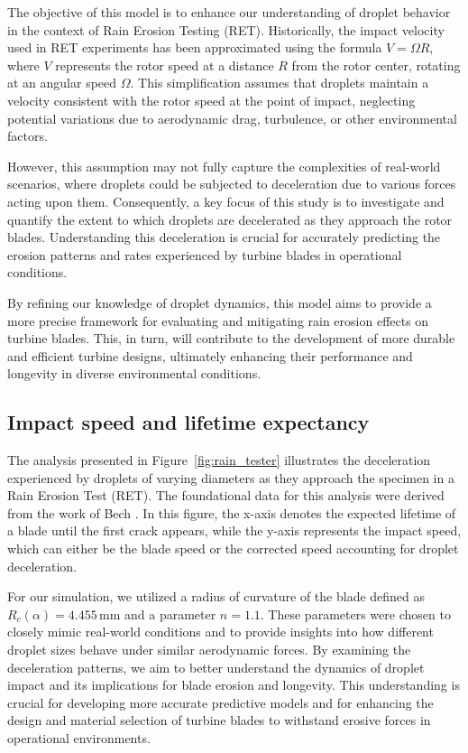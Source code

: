 \documentclass[10pt]{report}
\begin{document}
\par The objective of this model is to enhance our understanding of droplet behavior in the context of Rain Erosion Testing (RET). Historically, the impact velocity used in RET experiments has been approximated using the formula \( V = \Omega R \), where \( V \) represents the rotor speed at a distance \( R \) from the rotor center, rotating at an angular speed $\Omega$. This simplification assumes that droplets maintain a velocity consistent with the rotor speed at the point of impact, neglecting potential variations due to aerodynamic drag, turbulence, or other environmental factors.
\par However, this assumption may not fully capture the complexities of real-world scenarios, where droplets could be subjected to deceleration due to various forces acting upon them. Consequently, a key focus of this study is to investigate and quantify the extent to which droplets are decelerated as they approach the rotor blades. Understanding this deceleration is crucial for accurately predicting the erosion patterns and rates experienced by turbine blades in operational conditions.
\par By refining our knowledge of droplet dynamics, this model aims to provide a more precise framework for evaluating and mitigating rain erosion effects on turbine blades. This, in turn, will contribute to the development of more durable and efficient turbine designs, ultimately enhancing their performance and longevity in diverse environmental conditions.

\subsection*{Impact speed and lifetime expectancy}

The analysis presented in Figure~\ref{fig:rain_tester} illustrates the deceleration experienced by droplets of varying diameters as they approach the specimen in a Rain Erosion Test (RET). The foundational data for this analysis were derived from the work of Bech \cite{Bech2022}. In this figure, the x-axis denotes the expected lifetime of a blade until the first crack appears, while the y-axis represents the impact speed, which can either be the blade speed or the corrected speed accounting for droplet deceleration.

For our simulation, we utilized a radius of curvature of the blade defined as \( R_c(\alpha) = 4.455 \, \text{mm} \) and a parameter \( n = 1.1 \). These parameters were chosen to closely mimic real-world conditions and to provide insights into how different droplet sizes behave under similar aerodynamic forces. By examining the deceleration patterns, we aim to better understand the dynamics of droplet impact and its implications for blade erosion and longevity. This understanding is crucial for developing more accurate predictive models and for enhancing the design and material selection of turbine blades to withstand erosive forces in operational environments.
\end{document}
